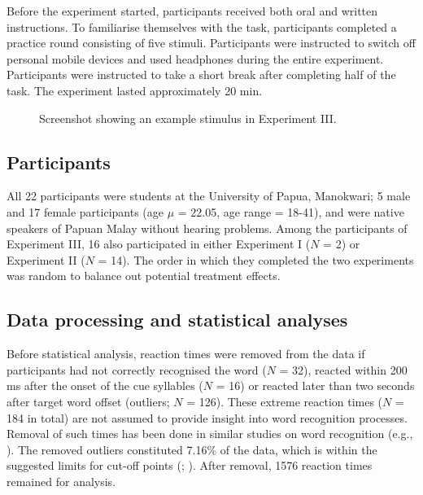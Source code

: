 Before the experiment started, participants received both oral and written instructions. To familiarise themselves with the task, participants completed a practice round consisting of five stimuli. Participants were instructed to switch off personal mobile devices and used headphones during the entire experiment. Participants were instructed to take a short break after completing half of the task. The experiment lasted approximately 20 min.


\begin{figure}

\fbox{\texttt{[image: 305]}}
\caption{Screenshot showing an example stimulus in Experiment III.}\label{fig305}
\end{figure}

\subsection{Participants}
All 22 participants were students at the University of Papua, Manokwari; 5 male and 17 female participants (age $\mu$ = 22.05, age range = 18-41), and were native speakers of Papuan Malay without hearing problems. Among the participants of Experiment III, 16 also participated in either Experiment I ($N$ = 2) or Experiment II ($N$ = 14). The order in which they completed the two experiments was random to balance out potential treatment effects.

\subsection{Data processing and statistical analyses} \label{sec344}
Before statistical analysis, reaction times were removed from the data if participants had not correctly recognised the word ($N$ = 32), reacted within 200 ms after the onset of the cue syllables ($N$ = 16) or reacted later than two seconds after target word offset (outliers; $N$ = 126). These extreme reaction times ($N$ = 184 in total) are not assumed to provide insight into word recognition processes. Removal of such times has been done in similar studies on word recognition (e.g., \citealt{balota_additive_2013}). The removed outliers constituted 7.16\% of the data, which is within the suggested limits for cut-off points (\citealt{ratcliff_methods_1993}; \citealt{baayen_analyzing_2010}). After removal, 1576 reaction times remained for analysis.

